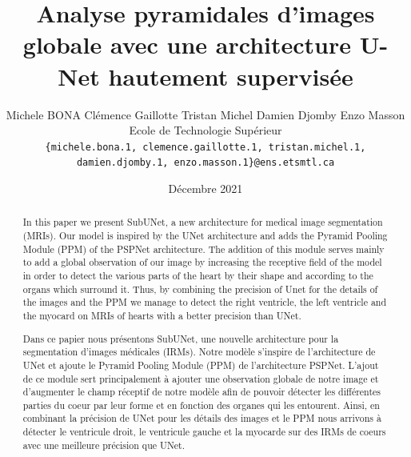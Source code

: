 \documentclass[french, english]{article}
\begin{document}

\title{Analyse pyramidales d'images globale avec une architecture U-Net hautement supervisée}


\author{
Michele BONA \quad Clémence Gaillotte \quad Tristan Michel \quad Damien Djomby \quad Enzo Masson\\
Ecole de Technologie Supérieur\\
{\tt\small \{michele.bona.1, clemence.gaillotte.1, tristan.michel.1, damien.djomby.1, enzo.masson.1\}@ens.etsmtl.ca}}
\date{Décembre 2021}

\maketitle

\normalsize

\begin{abstract}
In this paper we present SubUNet, a new architecture for medical image segmentation (MRIs). Our model is inspired by the UNet architecture and adds the Pyramid Pooling Module (PPM) of the PSPNet architecture. The addition of this module serves mainly to add a global observation of our image by increasing the receptive field of the model in order to detect the various parts of the heart by their shape and according to the organs which surround it. Thus, by combining the precision of Unet for the details of the images and the PPM we manage to detect the right ventricle, the left ventricle and the myocard on MRIs of hearts with a better precision than UNet.
\end{abstract}

\begin{abstract}
Dans ce papier nous présentons SubUNet, une nouvelle architecture pour la segmentation d'images médicales (IRMs). Notre modèle s'inspire de l'architecture de UNet et ajoute le Pyramid Pooling Module (PPM) de l'architecture PSPNet. L'ajout de ce module sert principalement à ajouter une observation globale de notre image et d'augmenter le champ réceptif de notre modèle afin de pouvoir détecter les différentes parties du coeur par leur forme et en fonction des organes qui les entourent. Ainsi, en combinant la précision de UNet pour les détails des images et le PPM nous arrivons à détecter le ventricule droit, le ventricule gauche et la myocarde sur des IRMs de coeurs avec une meilleure précision que UNet.
\end{abstract}
\end{document}
